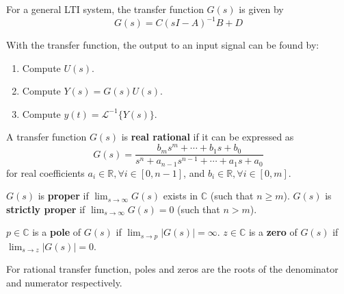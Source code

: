 \documentclass[11pt]{article}
\begin{document}
For a general LTI system, the transfer function \(G(s)\) is given by
$$
G(s) = C(sI - A)^{-1} B + D
$$

With the transfer function, the output to an input signal can be found by:
\begin{enumerate}
\item Compute \(U(s)\).
\item Compute \(Y(s) = G(s)U(s)\).
\item Compute \(y(t) = \mathcal{L}^{-1} \{ Y(s) \}\).
\end{enumerate}

A transfer function \(G(s)\) is \textbf{real rational} if it can be expressed as
$$
G(s) = \frac{b_{m}s^{m} + \cdots + b_{1}s + b_{0}}{s^{n} + a_{n-1}s^{n-1} + \cdots + a_{1} s + a_{0}}
$$
for real coefficients \(a_{i} \in \mathbb{R}, \forall i \in [0,n-1]\), and \(b_{i} \in \mathbb{R}, \forall i \in [0,m]\).

\(G(s)\) is \textbf{proper} if \(\lim_{s \to \infty}G(s)\) exists in \(\mathbb{C}\) (such that \(n \ge m\)).
\(G(s)\) is \textbf{strictly proper} if \(\lim_{s \to \infty}G(s) = 0\) (such that \(n > m\)).

\(p \in \mathbb{C}\) is a \textbf{pole} of \(G(s)\) if \(\lim_{s \to p} |G(s)| = \infty\).
\(z \in \mathbb{C}\) is a \textbf{zero} of \(G(s)\) if \(\lim_{s \to z} |G(s)| = 0\).

For rational transfer function, poles and zeros are the roots of the denominator and numerator respectively.

\begin{center}
\end{center}
\end{document}
